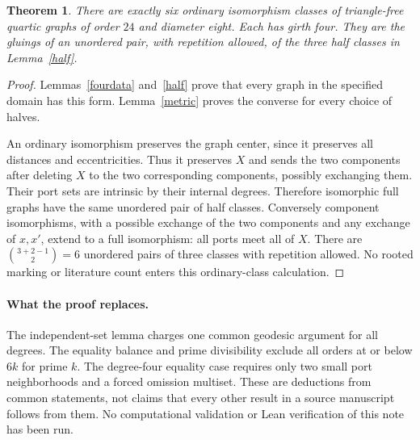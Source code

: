 \documentclass[11pt]{article}
\newtheorem{theorem}{Theorem}[section]
\begin{document}
\begin{theorem}\label{six}
There are exactly six ordinary isomorphism classes of triangle-free
quartic graphs of order $24$ and diameter eight. Each has girth four.
They are the gluings of an unordered pair, with repetition allowed,
of the three half classes in Lemma~\ref{half}.
\end{theorem}
\begin{proof}
Lemmas~\ref{fourdata} and~\ref{half} prove that every graph in the
specified domain has this form. Lemma~\ref{metric} proves the
converse for every choice of halves.

An ordinary isomorphism preserves the graph center, since it preserves
all distances and eccentricities. Thus it preserves $X$ and sends the
two components after deleting $X$ to the two corresponding components,
possibly exchanging them. Their port sets are intrinsic by their
internal degrees. Therefore isomorphic full graphs have the same
unordered pair of half classes. Conversely component isomorphisms,
with a possible exchange of the two components and any exchange of
$x,x'$, extend to a full isomorphism: all ports meet all of $X$.
There are $\binom{3+2-1}{2}=6$ unordered pairs of three classes with
repetition allowed. No rooted marking or literature count enters this
ordinary-class calculation.
\end{proof}

\paragraph{What the proof replaces.}
The independent-set lemma charges one common geodesic argument for
all degrees. The equality balance and prime divisibility exclude all
orders at or below $6k$ for prime $k$. The degree-four equality case
requires only two small port neighborhoods and a forced omission
multiset. These are deductions from common statements, not claims
that every other result in a source manuscript follows from them.
No computational validation or Lean verification of this note has
been run.
\end{document}

